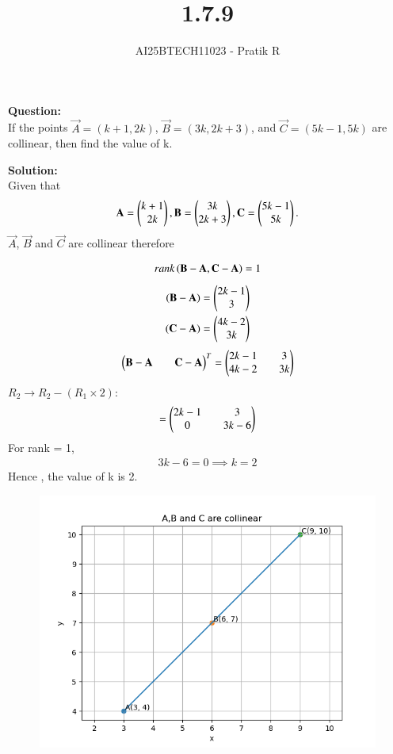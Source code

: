 \documentclass[journal]{IEEEtran}
\begin{document}

\vspace{3cm}

\title{1.7.9}
\author{AI25BTECH11023 - Pratik R
}
{\let\newpage\relax\maketitle}

\renewcommand{\thefigure}{\theenumi}
\renewcommand{\thetable}{\theenumi}
\setlength{\intextsep}{10pt} %


\renewcommand{\thetable}{\theenumi}


\textbf{Question: }\\
If the points $\vec A= (k + 1,2k)$, $\vec B= (3k,2k + 3)$, and $\vec C= (5k-1,5k)$ are collinear, then
find the value of k.

\textbf{Solution: } \\
Given that
$$
\mathbf A = \begin{pmatrix}k+1 \\ 2k\end{pmatrix}, \mathbf B = \begin{pmatrix}3k \\ 2k+3\end{pmatrix}, \mathbf C = \begin{pmatrix}5k-1 \\ 5k\end{pmatrix}.
$$
$\vec A$, $\vec B$ and $\vec C$ are collinear therefore

\begin{align}
    rank \left(\mathbf B- \mathbf A, \mathbf C -\mathbf A\right)=1 
\end{align}
\begin{align}
    (\mathbf B-\mathbf A) = \begin{pmatrix}2k-1 \\ 3\end{pmatrix}\\ (\mathbf C-\mathbf A) = \begin{pmatrix}4k-2 \\ 3k\end{pmatrix}
\end{align}
 \begin{align}
     \begin{pmatrix}\mathbf B -\mathbf A && \mathbf C -\mathbf A\end{pmatrix}^T =\begin{pmatrix}2k-1 && 3 \\ 4k-2&& 3k\end{pmatrix}  
 \end{align}
$R_2 \to R_2 - (R_1\times 2):$
 \begin{align}
 = \begin{pmatrix}2k-1 && 3 \\ 0 && 3k-6\end{pmatrix}
 \end{align}
For rank = 1,
\begin{align}
    3k -6 = 0 \implies k = 2
\end{align}
Hence , the value of k is 2.

\begin{figure}[h!]
    \centering
    \includegraphics[width=0.7\columnwidth]{figs/fig.png}
    \caption{}
\end{figure}
\end{document}
